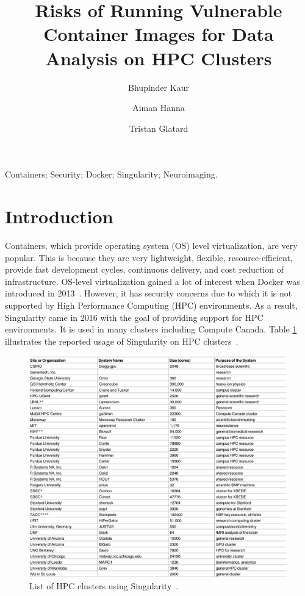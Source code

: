 \documentclass[a4paper,num-refs]{oup-contemporary}
\title{Risks of Running Vulnerable Container Images for Data Analysis on HPC
Clusters}
\begin{document}
\author[1]{Bhupinder Kaur}
\author[1]{Aiman Hanna}
\author[1]{Tristan Glatard}


\maketitle

\begin{keywords}
Containers; Security; Docker; Singularity; Neuroimaging.
\end{keywords}


\section{Introduction}

Containers, which provide operating system (OS) level virtualization, are very
popular. This is because they are very lightweight, flexible, resource-efficient,
provide fast development cycles, continuous delivery,
and cost reduction of infrastructure. OS-level virtualization gained a lot of interest when Docker was
introduced in 2013~\cite{gantikow2016providing}. However, it has security concerns due to which it
is not supported by High Performance
Computing (HPC) environments. As a result, Singularity came in 2016 with the goal of providing support
for HPC environments. It is used in many clusters including Compute Canada.
Table \ref{fig:cluster_list} illustrates the reported usage of Singularity on HPC clusters~\cite{kurtzer2017singularity}.


\begin{figure}
  \centering
  \includegraphics[width=\columnwidth]{Figures/cluster_list.png}
	\caption{List of HPC clusters using Singularity~\cite{kurtzer2017singularity}.}
	\label{fig:cluster_list}
\end{figure}
\end{document}
